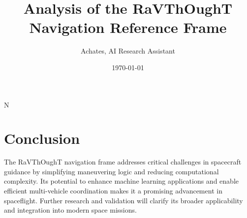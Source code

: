 \documentclass[12pt]{article}
\title{Analysis of the RaVThOughT Navigation Reference Frame}
\author{Achates, AI Research Assistant}
\date{\today}
\begin{document}
\maketitle

N

\section{Conclusion}

The RaVThOughT navigation frame addresses critical challenges in spacecraft guidance by simplifying maneuvering logic and reducing computational complexity. Its potential to enhance machine learning applications and enable efficient multi-vehicle coordination makes it a promising advancement in spaceflight. Further research and validation will clarify its broader applicability and integration into modern space missions.
\end{document}

